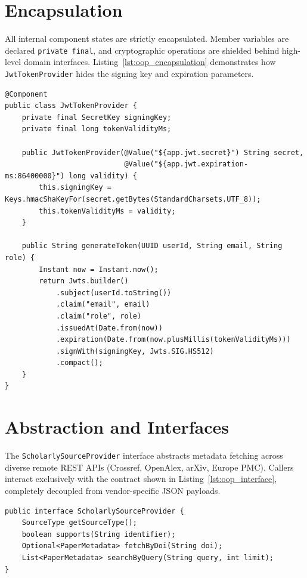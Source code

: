 \documentclass[11pt,a4paper,titlepage]{report}
\begin{document}
\section{Encapsulation}
All internal component states are strictly encapsulated. Member variables are declared \texttt{private final}, and cryptographic operations are shielded behind high-level domain interfaces. Listing~\ref{lst:oop_encapsulation} demonstrates how \texttt{JwtTokenProvider} hides the signing key and expiration parameters.

\begin{lstlisting}[caption={Encapsulation of Cryptographic Keys and Token Construction}, label={lst:oop_encapsulation}]
@Component
public class JwtTokenProvider {
    private final SecretKey signingKey;
    private final long tokenValidityMs;

    public JwtTokenProvider(@Value("${app.jwt.secret}") String secret,
                            @Value("${app.jwt.expiration-ms:86400000}") long validity) {
        this.signingKey = Keys.hmacShaKeyFor(secret.getBytes(StandardCharsets.UTF_8));
        this.tokenValidityMs = validity;
    }

    public String generateToken(UUID userId, String email, String role) {
        Instant now = Instant.now();
        return Jwts.builder()
            .subject(userId.toString())
            .claim("email", email)
            .claim("role", role)
            .issuedAt(Date.from(now))
            .expiration(Date.from(now.plusMillis(tokenValidityMs)))
            .signWith(signingKey, Jwts.SIG.HS512)
            .compact();
    }
}
\end{lstlisting}

\section{Abstraction and Interfaces}
The \texttt{ScholarlySourceProvider} interface abstracts metadata fetching across diverse remote REST APIs (Crossref, OpenAlex, arXiv, Europe PMC). Callers interact exclusively with the contract shown in Listing~\ref{lst:oop_interface}, completely decoupled from vendor-specific JSON payloads.

\begin{lstlisting}[caption={ScholarlySourceProvider Abstraction Interface}, label={lst:oop_interface}]
public interface ScholarlySourceProvider {
    SourceType getSourceType();
    boolean supports(String identifier);
    Optional<PaperMetadata> fetchByDoi(String doi);
    List<PaperMetadata> searchByQuery(String query, int limit);
}
\end{lstlisting}
\end{document}
